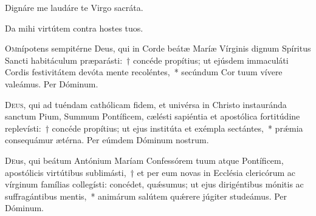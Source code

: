 \documentclass[vesperale_romanum.tex]{subfiles}
\begin{document}
 


\vv Dignáre me laudáre te Virgo sacráta. %

\rr Da mihi virtútem contra hostes tuos.


\oratio
\lettrine{O}{m}nípotens sempitérne Deus, qui in Corde beátæ Maríæ Vírginis dignum Spíritus Sancti habitáculum præparásti:~† concéde propítius; ut ejúsdem immaculáti Cordis festivitátem devóta mente recoléntes,~* secúndum Cor tuum vívere valeámus. Per Dóminum.






\duplexmtv

\oratio
\lettrine{D}{eus}, qui ad tuéndam cathólicam fidem, et univérsa in Christo instauránda san\-ctum Pium, Summum Pontíficem, cælésti sapiéntia et apostólica fortitúdine replevísti:~† concéde propítius; ut ejus institúta et exémpla se\-ctántes,~* prǽmia consequámur ætérna.
Per eúmdem Dóminum nostrum.

 

 
\oratio
\lettrine{D}{e}us,  qui beátum Antónium Maríam Confessórem tuum atque Pontíficem, apostólicis virtútibus sublimásti,~† et per eum novas in Ecclésia clericórum ac vírginum famílias collegísti: concédet, quǽsumus; ut ejus dirigéntibus mónitis ac suffragántibus mentis,~* animárum salútem quǽrere júgiter studeámus.
Per Dóminum.
\end{document}
